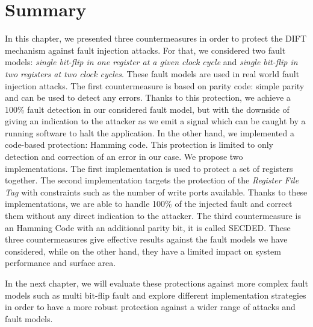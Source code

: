 \section{Summary}
In this chapter, we presented three countermeasures in order to protect the DIFT mechanism against fault injection attacks. For that, we considered two fault models: \textit{single bit-flip in one register at a given clock cycle} and \textit{single bit-flip in two registers at two clock cycles}. These fault models are used in real world fault injection attacks.
The first countermeasure is based on parity code: simple parity and can be used to detect any errors. Thanks to this protection, we achieve a 100\% fault detection in our considered fault model, but with the downside of giving an indication to the attacker as we emit a signal which can be caught by a running software to halt the application.
In the other hand, we implemented a code-based protection: Hamming code. This protection is limited to only detection and correction of an error in our case. We propose two implementations. The first implementation is used to protect a set of registers together. The second implementation targets the protection of the \textit{Register File Tag} with constraints such as the number of write ports available. Thanks to these implementations, we are able to handle 100\% of the injected fault and correct them without any direct indication to the attacker.
The third countermeasure is an Hamming Code with an additional parity bit, it is called SECDED.
These three countermeasures give effective results against the fault models we have considered, while on the other hand, they have a limited impact on system performance and surface area.

In the next chapter, we will evaluate these protections against more complex fault models such as multi bit-flip fault and explore different implementation strategies in order to have a more robust protection against a wider range of attacks and fault models.

